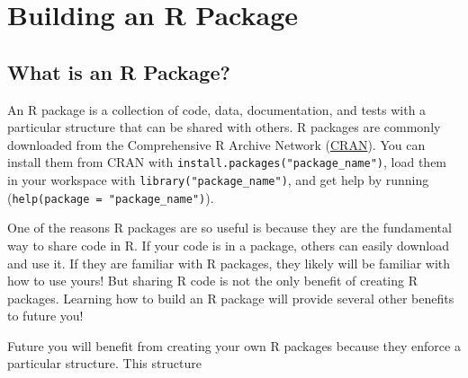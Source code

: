 \documentclass[
]{book}
\begin{document}
\hypertarget{r-package}{%
\chapter{Building an R Package}\label{r-package}}

\hypertarget{what-is-an-r-package}{%
\section{What is an R Package?}\label{what-is-an-r-package}}

An R package is a collection of code, data, documentation, and tests with a particular structure that can be shared with others. R packages are commonly downloaded from the Comprehensive R Archive Network (\href{https://cran.r-project.org/}{CRAN}). You can install them from CRAN with \texttt{install.packages("package\_name")}, load them in your workspace with \texttt{library("package\_name")}, and get help by running (\texttt{help(package\ =\ "package\_name")}).

One of the reasons R packages are so useful is because they are the fundamental way to share code in R. If your code is in a package, others can easily download and use it. If they are familiar with R packages, they likely will be familiar with how to use yours! But sharing R code is not the only benefit of creating R packages. Learning how to build an R package will provide several other benefits to future you!

Future you will benefit from creating your own R packages because they enforce a particular structure. This structure
\end{document}
